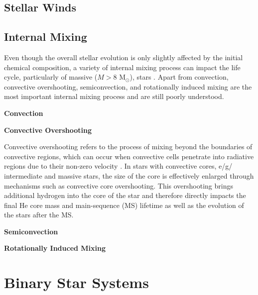 \subsection{Stellar Winds}



\subsection{Internal Mixing}\label{sub:mixing}

Even though the overall stellar evolution is only slightly affected by the initial chemical composition, a variety of internal mixing process can impact the life cycle, particularly of massive ($M>8$ M$_{\odot}$), stars \citep{langer2012presupernova}. Apart from convection, convective overshooting, semiconvection, and rotationally induced mixing are the most important internal mixing process \citep{schootemeijer2019constraining} and are still poorly understood. 

{\bf Convection}

{\bf Convective Overshooting}

Convective overshooting refers to the process of mixing beyond the boundaries of convective regions, which can occur when convective cells penetrate into radiative regions due to their non-zero velocity \citep{alongi1993evolutionary,brott2011rotating,schootemeijer2019constraining}. In stars with convective cores, e/g/ intermediate and massive stars, the size of the core is effectively enlarged through mechanisms such as convective core overshooting. This overshooting brings additional hydrogen into the core of the star and therefore directly impacts the final He core mass and main-sequence (MS) lifetime as well as the evolution of the stars after the MS.

{\bf Semiconvection}

{\bf Rotationally Induced Mixing}

\section{Binary Star Systems}

